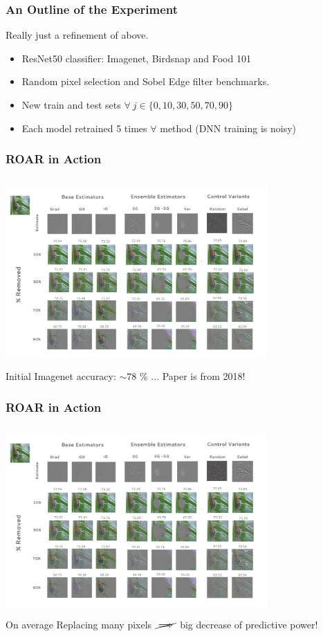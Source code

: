 \documentclass{beamer}
\theoremstyle{mystyle}
\begin{document}
\begin{frame}
	\frametitle{An Outline of the Experiment}
	Really just a refinement of above.
	\begin{itemize}
		\item ResNet50 classifier: Imagenet, Birdsnap and Food 101\pause
		\item Random pixel selection and Sobel Edge filter benchmarks.\pause
		\item  New train and test sets $\forall  \ j \in \{0,10,30,50,70,90\} $\pause
		\item Each model retrained 5 times $\forall $ method (DNN training is noisy) 
	\end{itemize}
\end{frame}

\begin{frame}
	\frametitle{ROAR in Action}
	\includegraphics[height=7.2cm, width=10cm]{ROAR_methods.png}\\ \pause
	Initial Imagenet accuracy: $\sim78$ \% ... \pause Paper is from 2018!
\end{frame}

\begin{frame}
	\frametitle{ROAR in Action}
	\includegraphics[height=7.2cm, width=10cm]{ROAR_methods.png}\\
	On average Replacing many pixels $\cancel{\implies}$ big decrease of predictive power! 

\end{frame}
\end{document}
